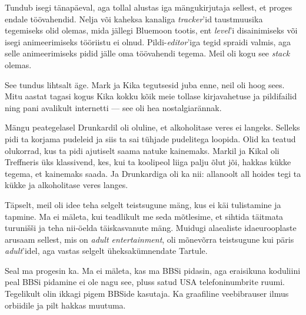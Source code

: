 Tundub isegi tänapäeval, aga tollal alustas iga mängukirjutaja sellest, et 
proges endale töövahendid. Nelja või 
kaheksa kanaliga \emph{tracker}'id taustmuusika tegemiseks olid olemas, mida jällegi 
Bluemoon tootis, ent \emph{level}'i disainimiseks või isegi 
animeerimiseks tööriistu ei olnud. Pildi-\emph{editor}'iga tegid spraidi valmis, aga selle animeerimiseks pidid 
jälle oma töövahendi tegema. Meil oli kogu see \emph{stack} olemas.


See tundus lihtsalt äge. Mark ja 
Kika tegutsesid juba enne, neil oli hoog 
sees. Mitu aastat tagasi kogus Kika kokku kõik meie tollase 
kirjavahetuse ja pildifailid ning pani avalikult internetti --- see oli hea
nostalgiarännak. 

Mängu peategelasel Drunkardil oli oluline, et alkoholitase 
veres ei langeks. Selleks pidi ta korjama pudeleid ja siis ta sai 
tühjade pudelitega loopida. Olid ka teatud olukorrad, kus ta pidi ajutiselt 
saama natuke kainemaks. Markil ja 
Kikal oli Treffneris üks klassivend, kes, kui ta 
koolipeol liiga palju õlut jõi, hakkas kükke tegema, et kainemaks saada. Ja 
Drunkardiga oli ka nii: allanoolt all hoides tegi ta kükke ja alkoholitase veres langes.


Täpselt, meil oli idee teha selgelt teistsugune mäng, kus ei käi 
tulistamine ja tapmine. Ma ei mäleta, kui 
teadlikult me seda mõtlesime, et sihtida täitmata turunišši ja teha nii-öelda 
täiskasvanute mäng. Muidugi alaealiste idaeurooplaste arusaam sellest, mis 
on \emph{adult entertainment}, oli mõnevõrra teistsugune kui päris 
\emph{adult}'idel, aga vastas selgelt üheksakümnendate Tartule.


Seal ma progesin ka. Ma ei mäleta, kas ma BBSi pidasin, aga 
eraisikuna koduliini peal BBSi pidamine ei ole nagu see, 
pluss satud USA telefoninumbrite ruumi. Tegelikult olin ikkagi pigem 
BBSide kasutaja. Ka graafiline veebibrauser ilmus orbiidile ja pilt hakkas 
muutuma. 

